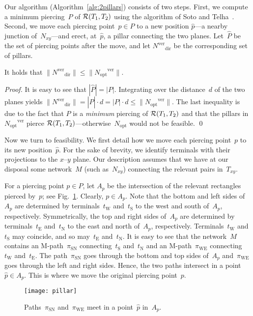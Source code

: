 \documentclass[11pt]{llncs}
\newcommand{\MSN}{\ensuremath{\pi_\mathrm{SN}}\xspace}
\newcommand{\MWE}{\ensuremath{\pi_\mathrm{WE}}\xspace}
\newcommand{\tE}{\ensuremath{t_\mathrm{E}}\xspace}
\newcommand{\tW}{\ensuremath{t_\mathrm{W}}\xspace}
\newcommand{\tS}{\ensuremath{t_\mathrm{S}}\xspace}
\newcommand{\tN}{\ensuremath{t_\mathrm{N}}\xspace}
\newcommand{\Nopt}{\ensuremath{N_\mathrm{opt}}\xspace}
\newcommand{\Nver}{\ensuremath{N^\mathrm{ver}}\xspace}
\newcommand{\dir}{\ensuremath{\mathrm{dir}}}
\newcommand{\Noptver}{\ensuremath{\Nopt^\mathrm{ver}}\xspace}
\newcommand{\Nxy}{\ensuremath{N_{xy}}\xspace}
\newcommand{\Txy}{\ensuremath{T_{xy}}\xspace}
\newenvironment{pf}{\begin{proof}}{\qed\end{proof}}
\begin{document}
Our algorithm (Algorithm~\ref{alg:2pillars}) consists of two steps.
First, we compute a minimum 
piercing~$P$ of ${\cal R}(T_1,T_2)$ using the algorithm of Soto and
Telha~\cite{st-2dorg-11}.  Second, we move each piercing point~$p \in
P$ to a new position $\hat{p}$---a nearby junction of~\Nxy---and
erect, at~$\hat{p}$, a pillar connecting the two planes.
Let~$\hat{P}$ be the set of piercing points after the move, and let
$\Nver_\dir$ be the corresponding set of pillars.

\begin{lemma}
  \label{lem:4approx}
  It holds that $\|\Nver_\dir\| \le \|\Noptver\|$.
\end{lemma}

\begin{pf}
  It is easy to see that $|\hat{P}|=|P|$.  Integrating over the
  distance~$d$ of the 
  two planes yields $\|\Nver_\dir\| = |\hat{P}| \cdot d = |P| \cdot d
  \le \|\Noptver\|$.  The last inequality is due to the fact that $P$
  is a \emph{minimum} piercing of ${\cal R}(T_1,T_2)$ and that the pillars
  in~\Noptver pierce ${\cal R}(T_1,T_2)$---otherwise~\Nopt would not
  be feasible.
\end{pf}

Now we turn to feasibility.  We first detail how we move each piercing
point~$p$ to its new position~$\hat{p}$.  For the sake of brevity, we
identify terminals with their projections to the $x$--$y$ plane.  Our
description assumes that we have at our disposal some network~$M$
(such as~\Nxy) connecting the relevant pairs in~\Txy. 

For a piercing point $p \in P$, let $A_p$ be the intersection
of the relevant rectangles pierced by~$p$; see
Fig.~\ref{fig:piercing}.  Clearly, $p \in A_p$.  Note that the bottom
and left  
sides of~$A_p$ are determined by terminals~\tW and~\tS to the west and
south of~$A_p$, respectively.  Symmetrically, the top and right sides
of~$A_p$ are determined by terminals~\tE and~\tN to the east and north
of~$A_p$, respectively.  Terminals~\tW and~\tS may coincide,
and so may~\tE and~\tN.  It is easy to see that the network~$M$
contains an M-path~\MSN 
connecting~\tS and~\tN and an M-path~\MWE connecting~\tW and~\tE.  The
path~\MSN goes through the bottom and top sides of~$A_p$ and~\MWE goes
through the left and right sides.  Hence, the two paths intersect in a
point~$\hat{p} \in A_p$.  This is where we move the original piercing
point~$p$.  

\begin{figure}
  \centering
  \texttt{[image: pillar]}
  \caption{Paths~\MSN and~\MWE meet in a point~$\hat{p}$ in~$A_p$.}
  \label{fig:piercing}
\end{figure}
\end{document}

